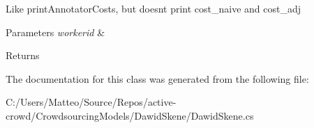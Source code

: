 Like print\+Annotator\+Costs, but doesn\textquotesingle{}t print cost\+\_\+naive and cost\+\_\+adj 


\begin{DoxyParams}{Parameters}
{\em workerid} & \\
\hline
\end{DoxyParams}
\begin{DoxyReturn}{Returns}

\end{DoxyReturn}


The documentation for this class was generated from the following file\+:\begin{DoxyCompactItemize}
\item 
C\+:/\+Users/\+Matteo/\+Source/\+Repos/active-\/crowd/\+Crowdsourcing\+Models/\+Dawid\+Skene/Dawid\+Skene.\+cs\end{DoxyCompactItemize}
